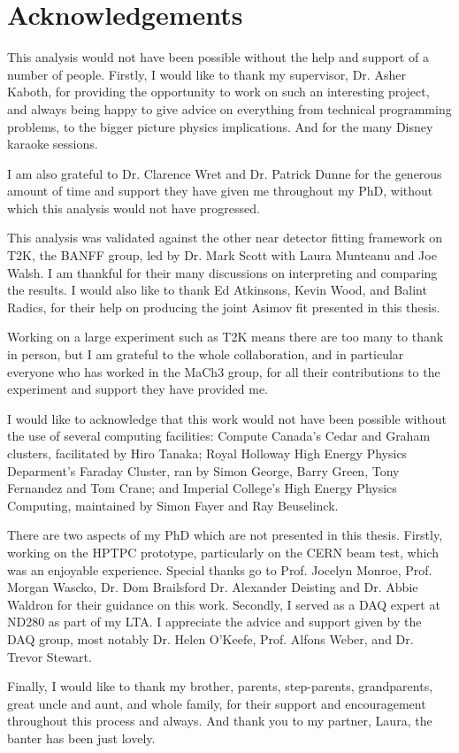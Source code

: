 \chapter*{Acknowledgements}

This analysis would not have been possible without the help and support of a number of people. Firstly, I would like to thank my supervisor, Dr. Asher Kaboth, for providing the opportunity to work on such an interesting project, and always being happy to give advice on everything from technical programming problems, to the bigger picture physics implications. And for the many Disney karaoke sessions.

I am also grateful to Dr. Clarence Wret and Dr. Patrick Dunne for the generous amount of time and support they have given me throughout my PhD, without which this analysis would not have progressed.

This analysis was validated against the other near detector fitting framework on T2K, the BANFF group, led by Dr. Mark Scott with Laura Munteanu and Joe Walsh. I am thankful for their many discussions on interpreting and comparing the results. I would also like to thank Ed Atkinsons, Kevin Wood, and Balint Radics, for their help on producing the joint Asimov fit presented in this thesis.

Working on a large experiment such as T2K means there are too many to thank in person, but I am grateful to the whole collaboration, and in particular everyone who has worked in the MaCh3 group, for all their contributions to the experiment and support they have provided me.

I would like to acknowledge that this work would not have been possible without the use of several computing facilities: Compute Canada's Cedar and Graham clusters, facilitated by Hiro Tanaka; Royal Holloway High Energy Physics Deparment's Faraday Cluster, ran by Simon George, Barry Green, Tony Fernandez and Tom Crane; and Imperial College's High Energy Physics Computing, maintained by Simon Fayer and Ray Beuselinck.

There are two aspects of my PhD which are not presented in this thesis. Firstly, working on the HPTPC prototype, particularly on the CERN beam test, which was an enjoyable experience. Special thanks go to Prof. Jocelyn Monroe, Prof. Morgan Wascko, Dr. Dom Brailsford Dr. Alexander Deisting and Dr. Abbie Waldron for their guidance on this work. Secondly, I served as a DAQ expert at ND280 as part of my LTA. I appreciate the advice and support given by the DAQ group, most notably Dr. Helen O'Keefe, Prof. Alfons Weber, and Dr. Trevor Stewart.

Finally, I would like to thank my brother, parents, step-parents, grandparents, great uncle and aunt, and whole family, for their support and encouragement throughout this process and always. And thank you to my partner, Laura, the banter has been just lovely.

\newpage